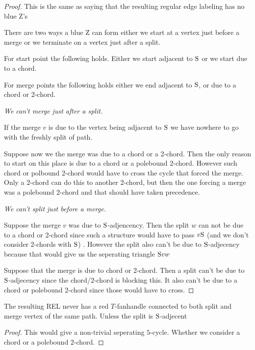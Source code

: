       \begin{proof}
        This is the same as saying that the resulting regular edge labeling has no blue Z's

        There are two ways a blue Z can form either we start at a vertex just before a merge or we terminate on a vertex just after a split.

        For start point the following holds. Either we start adjacent to $\mathrm{S}$ or we start due to a chord.

        For merge points the following holds either we end adjacent to $\mathrm{S}$, or due to a chord or 2-chord.

        \vspace{2ex}
        \emph{We can't merge just after a split.}

        If the merge $v$ is due to the vertex being adjacent to $\mathrm{S}$ we have nowhere to go with the freshly split of path. 

        Suppose now we the merge was due to a chord or a 2-chord. Then the only reason to start on this place is due to a chord or a polebound 2-chord. However such chord or polbound 2-chord would have to cross the cycle that forced the merge. Only a 2-chord can do this to another 2-chord, but then the one forcing a merge was a polebound 2-chord and that should have taken precedence.


        \vspace{2ex}
        \emph{We can't split just before a merge.}

        Suppose the merge $v$ was due to $\mathrm{S}$-adjencency. Then the split $w$ can not be due to a chord or 2-chord since such a structure would have to pass $v \mathrm{S}$ (and we don't consider 2-chords with $\mathrm{S}$) . However the split also can't be due to $\mathrm{S}$-adjecency because that would give us the seperating triangle $\mathrm{S} v w$

        Suppose that the merge is due to chord or 2-chord. Then a split can't be due to $\mathrm{S}$-adjecency since the chord/2-chord is blocking this. It also can't be due to a chord or polebound 2-chord since those would have to cross.

      \end{proof}


      \begin{lemma}
        \label{lm:}
        The resulting REL never has a red $T$-fanhandle connected to both split and merge vertex of the same path. Unless the split is $\mathrm{S}$-adjecent 
      \end{lemma}
      \begin{proof}
          This would give a non-trivial seperating $5$-cycle. Whether we consider a chord or a polebound 2-chord.
      \end{proof}

